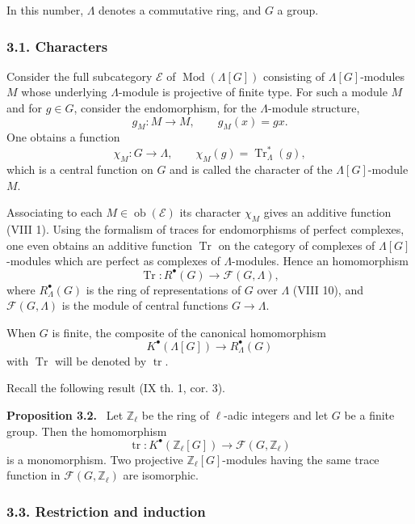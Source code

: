 \documentclass[11pt]{article}
\newenvironment{statement}[1]{\par\medskip\noindent\textbf{#1.}\ }{\par\medskip}
\providecommand{\Tr}{\operatorname{Tr}}
\providecommand{\Tr}{\operatorname{Tr}}
\providecommand{\Ob}{\operatorname{ob}}
\providecommand{\Tr}{\operatorname{Tr}}
\providecommand{\Ob}{\operatorname{ob}}
\providecommand{\Tr}{\operatorname{Tr}}
\providecommand{\Ob}{\operatorname{Ob}}
\providecommand{\Mod}{\operatorname{Mod}}
\providecommand{\tr}{\operatorname{tr}}
\providecommand{\Tr}{\operatorname{Tr}}
\providecommand{\Ob}{\operatorname{ob}}
\providecommand{\Ob}{\operatorname{Ob}}
\begin{document}
In this number, $\Lambda$ denotes a commutative ring, and $G$ a group.

\subsubsection*{3.1. Characters}\label{sga5:X:subsubsection:3.1}

Consider the full subcategory $\mathcal E$ of $\Mod(\Lambda[G])$ consisting of $\Lambda[G]$-modules $M$ whose underlying $\Lambda$-module is projective of finite type. For such a module $M$ and for $g\in G$, consider the endomorphism, for the $\Lambda$-module structure,
\[
g_M:M\longrightarrow M,
\qquad g_M(x)=gx.
\]
One obtains a function
\[
\chi_M:G\longrightarrow \Lambda,
\qquad \chi_M(g)=\Tr^*_\Lambda(g),
\]
which is a central function on $G$ and is called the character of the $\Lambda[G]$-module $M$.

Associating to each $M\in\Ob(\mathcal E)$ its character $\chi_M$ gives an additive function (VIII 1). Using the formalism of traces for endomorphisms of perfect complexes, one even obtains an additive function $\Tr$ on the category of complexes of $\Lambda[G]$-modules which are perfect as complexes of $\Lambda$-modules. Hence an homomorphism
\[
\Tr:R^{\bullet}(G)\longrightarrow \mathcal F(G,\Lambda),
\]
where $R^{\bullet}_{\Lambda}(G)$ is the ring of representations of $G$ over $\Lambda$ (VIII 10), and $\mathcal F(G,\Lambda)$ is the module of central functions $G\to\Lambda$.

When $G$ is finite, the composite of the canonical homomorphism
\[
K^{\bullet}(\Lambda[G])\longrightarrow R^{\bullet}_{\Lambda}(G)
\]
with $\Tr$ will be denoted by $\tr$.

Recall the following result (IX th. 1, cor. 3).

\label{sga5:X:proposition:3.2}\begin{statement}{Proposition 3.2}
Let $\mathbb Z_\ell$ be the ring of $\ell$-adic integers and let $G$ be a finite group. Then the homomorphism
\[
\tr:K^{\bullet}(\mathbb Z_\ell[G])\longrightarrow \mathcal F(G,\mathbb Z_\ell)
\]
is a monomorphism. Two projective $\mathbb Z_\ell[G]$-modules having the same trace function in $\mathcal F(G,\mathbb Z_\ell)$ are isomorphic.
\end{statement}

\subsubsection*{3.3. Restriction and induction}\label{sga5:X:subsubsection:3.3}
\end{document}
